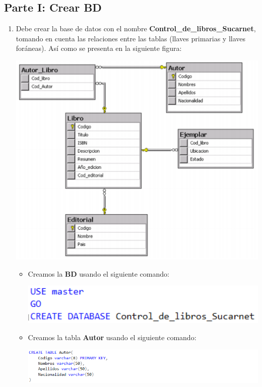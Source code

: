 \documentclass[12pt,letterpaper]{article}
\newcommand\tab[1][1cm]{\hspace*{#1}}
\begin{document}
    \subsection{Parte I: Crear BD}
    \begin{enumerate}[\tab 1.]
        \item Debe crear la base de datos con el nombre \textbf{Control\_de\_libros\_Sucarnet}, tomando en cuenta las relaciones entre las tablas (llaves primarias y llaves foráneas). Así como se presenta en la siguiente figura:\\[0.1in]
        \begin{center}
            \includegraphics[width=13cm]{./img/img1.png}
        \end{center}
        \begin{itemize}
            \item Creamos la \textbf{BD} usando el siguiente comando:
            \begin{center}
                \includegraphics[width=13cm]{./img/img1.1.png}
            \end{center}
            \item Creamos la tabla \textbf{Autor} usando el siguiente comando:
            \begin{center}
                \includegraphics[width=13cm]{./img/img1.2.png}

\end{center}
\end{itemize}
\end{enumerate}
\end{document}
